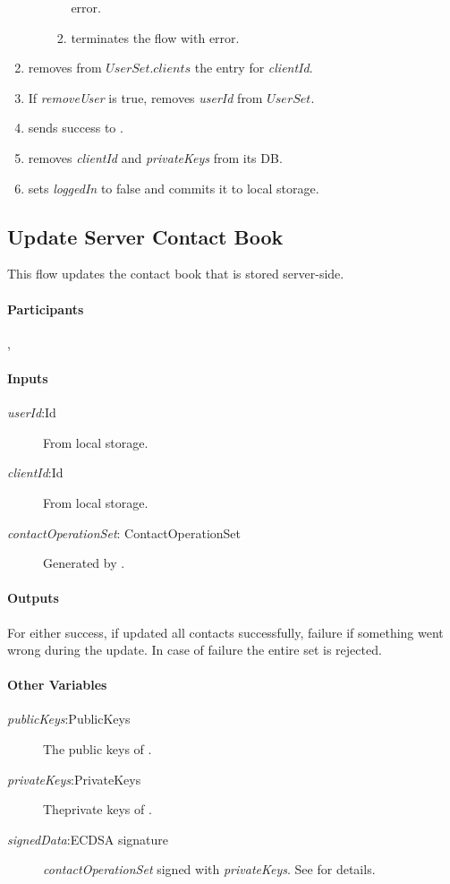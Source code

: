 \documentclass[a4paper,10pt,draft]{article}
\newcommand{\signedData}{\emph{signedData}}
\newcommand{\privateKeys}{\emph{privateKeys}}
\newcommand{\publicKeys}{\emph{publicKeys}}
\newcommand{\userId}{\emph{userId}}
\newcommand{\clientId}{\emph{clientId}}
\newcommand{\loggedIn}{\emph{loggedIn}}
\newcommand{\removeUser}{\emph{removeUser}}
\newcommand{\contactOperationSet}{\emph{contactOperationSet}}
\begin{document}
\begin{enumerate}
\begin{enumerate}
\begin{enumerate}
error.
   \item \Client{} terminates the flow with error.
  \end{enumerate}
 \end{enumerate}
 \item\label{delete_client:first} \Server{} removes from $UserSet.clients$ the 
entry for \clientId{}.
 \item If \removeUser{} is true, \Server{} removes \userId{} from $UserSet$.
 \item \Server{} sends success to \Client{}.
 \item \Client{} removes \clientId{} and \privateKeys{} from its DB.
 \item \Client{} sets \loggedIn{} to false and commits it to local storage.
\end{enumerate}

\subsection{Update Server Contact Book}
This flow updates the contact book that is stored server-side.

\paragraph{Participants} \Client{}, \Server{}

\paragraph{Inputs}
\SpecialItem
\begin{description}
 \item[\userId{}:Id] From \Client{} local storage.
 \item[\clientId{}:Id] From \Client{} local storage.
 \item[\contactOperationSet{}: ContactOperationSet] Generated by \Client{}.
\end{description}

\paragraph{Outputs}
For \Client{} either success, if \Server{} updated all contacts successfully, failure if something went wrong during the update. In case of failure the entire set is rejected.

\paragraph{Other Variables}
\SpecialItem
\begin{description}
 \item[\publicKeys{}:PublicKeys] The public keys of  \Client{}. 
 \item[\privateKeys{}:PrivateKeys] Theprivate keys of \Client{}.
 \item[\signedData{}:ECDSA signature] \contactOperationSet{} signed with
\privateKeys{}. See \cite{crypto_spec} for details.
\end{description}
\end{document}
